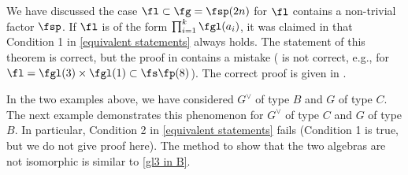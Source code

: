 \documentclass[12pt]{amsart}
\begin{document}
\begin{rmk} \label{sp is bad}
    We have discussed the case $\fl\subset \fg= \fsp(2n)$ for $\fl$ contains a non-trivial factor $\fsp$. If $\fl$ is of the form $\prod_{i=1}^{k}\fgl({a_i})$, it was claimed in \cite[Theorem 3]{Tanisaki} that Condition 1 in \cref{equivalent statements} always holds. The statement of this theorem is correct, but the proof in \cite{Tanisaki} contains a mistake (\cite[Lemma 7]{Tanisaki} is not correct, e.g., for $\fl= \fgl(3)\times \fgl(1)\subset \fs\fp(8)$). The correct proof is given in \cite[Sections 2,3]{hoang2}. 
\end{rmk}


In the two examples above, we have considered $G^\vee$ of type $B$ and $G$ of type $C$. The next example demonstrates this phenomenon for $G^\vee$ of type $C$ and $G$ of type $B$. In particular, Condition 2 in \cref{equivalent statements} fails (Condition 1 is true, but we do not give proof here). The method to show that the two algebras are not isomorphic is similar to \cref{gl3 in B}. 
\end{document}
